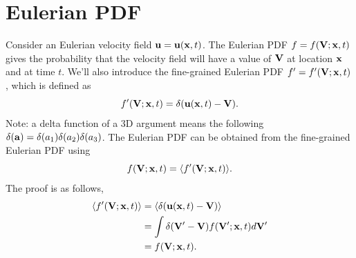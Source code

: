 \documentclass[a4paper,11pt]{report}
\begin{document}
\section{Eulerian PDF}
Consider an Eulerian velocity field $\mathbf{u} = \mathbf{u}(\mathbf{x},t)$. The Eulerian PDF $f = f(\mathbf{V}; \mathbf{x},t)$ gives the probability that the velocity field will have a value of $\mathbf{V}$ at location $\mathbf{x}$ and at time $t$. We'll also introduce the fine-grained Eulerian PDF $f' = f'(\mathbf{V};\mathbf{x},t)$, which is defined as 
\begin{equation}
    f'(\mathbf{V}; \mathbf{x}, t) = \delta(\mathbf{u}(\mathbf{x},t) - \mathbf{V}).
\end{equation}
Note: a delta function of a 3D argument means the following $\delta(\mathbf{a}) = \delta(a_1) \delta(a_2) \delta(a_3) $. The Eulerian PDF can be obtained from the fine-grained Eulerian PDF using 
\begin{equation}
    \label{eq:fine_eul_pdf}
    f(\mathbf{V}; \mathbf{x}, t)=\langle f'(\mathbf{V}; \mathbf{x}, t) \rangle.
\end{equation}
The proof is as follows,
\begin{align}
    \langle f'(\mathbf{V}; \mathbf{x}, t) \rangle &= \langle \delta( \mathbf{u}(\mathbf{x},t) - \mathbf{V}) \rangle \nonumber \\
    &= \int \delta( \mathbf{V}' - \mathbf{V}) f(\mathbf{V}';\mathbf{x},t) d\mathbf{V}' \nonumber \\
    &= f(\mathbf{V}; \mathbf{x}, t).
\end{align}

\end{document}
